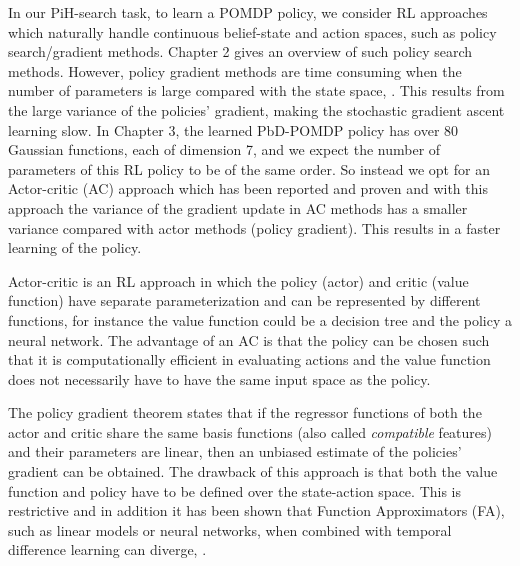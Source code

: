 In our PiH-search task, to learn a POMDP policy, we consider RL approaches which naturally handle continuous 
belief-state and action spaces, such as policy search/gradient methods. Chapter 2 gives an overview of 
such policy search methods. However, policy gradient methods are time consuming when the number of parameters 
is large compared with the state space, \cite{ACML_variance_2015}.
This results from the large variance of the policies' gradient, making the stochastic gradient ascent learning slow. 
In Chapter 3, the learned PbD-POMDP policy has over 80 Gaussian functions, each of dimension 7, and we expect the 
number of parameters of this RL policy to be of the same order. So instead we opt for an Actor-critic (AC) approach 
which has been reported and proven \cite{rl_ac_surv_2012} and with this approach the variance of the gradient update in 
AC methods has a smaller variance compared with actor methods (policy gradient). This results in a faster learning of 
the policy. 

Actor-critic \cite[Chap. 6.6]{sutton98a} is an RL approach in which the policy (actor) and critic (value function) 
have separate parameterization and can be represented by different functions, for instance the value function could be a 
decision tree and the policy a neural network. The advantage of an AC is that the policy can be chosen such 
that it is computationally efficient in evaluating actions and the value function does not necessarily have to have
the same input space as the policy.  %

The policy gradient theorem \cite{Sutton00policygradient} states that if the regressor functions of both the
actor and critic share the same basis functions (also called \textit{compatible} features) and their parameters are linear, 
then an unbiased estimate of the policies' gradient can be obtained. The drawback of this 
approach is that both the value function and policy have to be defined over the state-action space.  
This is restrictive and in addition it has been shown that Function Approximators (FA), such as linear models 
or neural networks, when combined with temporal difference learning can diverge, \cite{Safe_val_function_1995}.

